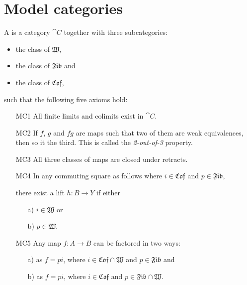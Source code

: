 
\section{Model categories}
\label{sec:model_categories}

\newcommand{\W}{\mathfrak{W}}
\newcommand{\Fib}{\mathfrak{Fib}}
\newcommand{\Cof}{\mathfrak{Cof}}

\begin{definition}
	A  is a category $\cat{C}$ together with three subcategories:
	\begin{itemize}
		\item the class of  $\W$,
		\item the class of  $\Fib$ and
		\item the class of  $\Cof$,
	\end{itemize}
	such that the following five axioms hold:
	\begin{itemize}
		\item[MC1] All finite limits and colimits exist in $\cat{C}$.
		\item[MC2] If $f$, $g$ and $fg$ are maps such that two of them are weak equivalences, then so it the third. This is called the \emph{2-out-of-3} property.
		\item[MC3] All three classes of maps are closed under retracts.
		\item[MC4] In any commuting square as follows where $i \in \Cof$ and $p \in \Fib$,

			there exist a lift $h: B \to Y$ if either 
			\begin{itemize}
				\item[a)] $i \in \W$ or
				\item[b)] $p \in \W$.
			\end{itemize}
		\item[MC5] Any map $f : A \to B$ can be factored in two ways:
			\begin{itemize}
				\item[a)] as $f = pi$, where $i \in \Cof \cap \W$ and $p \in \Fib$ and
				\item[b)] as $f = pi$, where $i \in \Cof$ and $p \in \Fib \cap \W$.
			\end{itemize}
	\end{itemize}
\end{definition}



